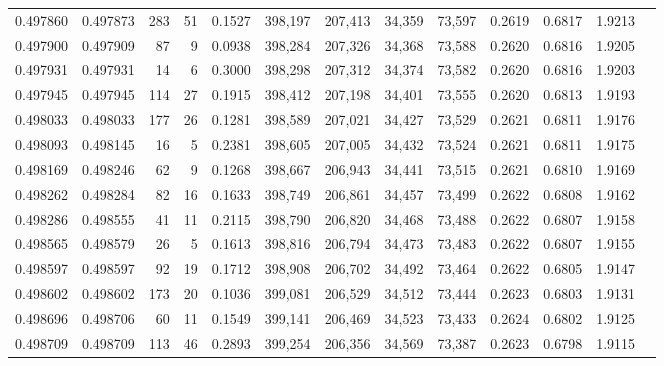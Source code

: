 \begin{tabular}{rrrrrrrrrrrrr}
0.497860 & 0.497873 &   283 &    51 &                                     0.1527 & 398,197 & 207,413 &  34,359 &  73,597 & 0.2619 & 0.6817 & 1.9213 \\
0.497900 & 0.497909 &    87 &     9 &                                     0.0938 & 398,284 & 207,326 &  34,368 &  73,588 & 0.2620 & 0.6816 & 1.9205 \\
0.497931 & 0.497931 &    14 &     6 &                                     0.3000 & 398,298 & 207,312 &  34,374 &  73,582 & 0.2620 & 0.6816 & 1.9203 \\
0.497945 & 0.497945 &   114 &    27 &                                     0.1915 & 398,412 & 207,198 &  34,401 &  73,555 & 0.2620 & 0.6813 & 1.9193 \\
0.498033 & 0.498033 &   177 &    26 &                                     0.1281 & 398,589 & 207,021 &  34,427 &  73,529 & 0.2621 & 0.6811 & 1.9176 \\
0.498093 & 0.498145 &    16 &     5 &                                     0.2381 & 398,605 & 207,005 &  34,432 &  73,524 & 0.2621 & 0.6811 & 1.9175 \\
0.498169 & 0.498246 &    62 &     9 &                                     0.1268 & 398,667 & 206,943 &  34,441 &  73,515 & 0.2621 & 0.6810 & 1.9169 \\
0.498262 & 0.498284 &    82 &    16 &                                     0.1633 & 398,749 & 206,861 &  34,457 &  73,499 & 0.2622 & 0.6808 & 1.9162 \\
0.498286 & 0.498555 &    41 &    11 &                                     0.2115 & 398,790 & 206,820 &  34,468 &  73,488 & 0.2622 & 0.6807 & 1.9158 \\
0.498565 & 0.498579 &    26 &     5 &                                     0.1613 & 398,816 & 206,794 &  34,473 &  73,483 & 0.2622 & 0.6807 & 1.9155 \\
0.498597 & 0.498597 &    92 &    19 &                                     0.1712 & 398,908 & 206,702 &  34,492 &  73,464 & 0.2622 & 0.6805 & 1.9147 \\
0.498602 & 0.498602 &   173 &    20 &                                     0.1036 & 399,081 & 206,529 &  34,512 &  73,444 & 0.2623 & 0.6803 & 1.9131 \\
0.498696 & 0.498706 &    60 &    11 &                                     0.1549 & 399,141 & 206,469 &  34,523 &  73,433 & 0.2624 & 0.6802 & 1.9125 \\
0.498709 & 0.498709 &   113 &    46 &                                     0.2893 & 399,254 & 206,356 &  34,569 &  73,387 & 0.2623 & 0.6798 & 1.9115 \\

\end{tabular}
